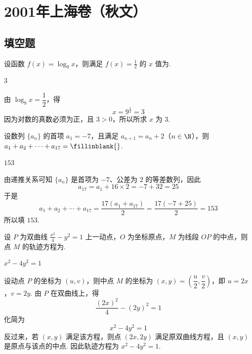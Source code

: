 \chapter{2001年上海卷（秋文）}
\section{填空题}
\begin{problem}
设函数 \(f(x)=\log_{9}x\)，则满足 \(f(x)=\frac{1}{2}\) 的 \(x\) 值为\fillinblank{}.
\end{problem}

\begin{answer}
\(3\)
\end{answer}

\begin{solution}
由 \(\log_{9}x=\dfrac{1}{2}\)，得
\[
x=9^{\frac{1}{2}}=3
\]
因为对数的真数必须为正，且 \(3>0\)，所以所求 \(x\) 为 \(3\).
\end{solution}

\begin{problem}
设数列 \(\{a_n\}\) 的首项 \(a_1=-7\)，且满足 \(a_{n+1}=a_n+2\)（\(n\in\N\)），则 \(a_1+a_2+\cdots+a_{17}=\fillinblank{}\).
\end{problem}

\begin{answer}
\(153\)
\end{answer}

\begin{solution}
由递推关系可知 \(\{a_n\}\) 是首项为 \(-7\)、公差为 \(2\) 的等差数列，因此
\[
a_{17}=a_1+16\times2=-7+32=25
\]
于是
\[
a_1+a_2+\cdots+a_{17}=\frac{17(a_1+a_{17})}{2}=\frac{17(-7+25)}{2}=153
\]
所以填 \(153\).
\end{solution}

\begin{problem}
设 \(P\) 为双曲线 \(\frac{x^2}{4}-y^2=1\) 上一动点，\(O\) 为坐标原点，\(M\) 为线段 \(OP\) 的中点，则点 \(M\) 的轨迹方程为\fillinblank{}.
\end{problem}

\begin{answer}
\(x^2-4y^2=1\)
\end{answer}

\begin{solution}
设动点 \(P\) 的坐标为 \((u,v)\)，则中点 \(M\) 的坐标为 \((x,y)=\left(\dfrac{u}{2},\dfrac{v}{2}\right)\)，即 \(u=2x\)，\(v=2y\). 由 \(P\) 在双曲线上，得
\[
\frac{(2x)^2}{4}-(2y)^2=1
\]
化简为
\[
x^2-4y^2=1
\]
反过来，若 \((x,y)\) 满足该方程，则点 \((2x,2y)\) 满足原双曲线方程，且 \((x,y)\) 是原点与该点的中点. 因此轨迹方程为 \(x^2-4y^2=1\).
\end{solution}

